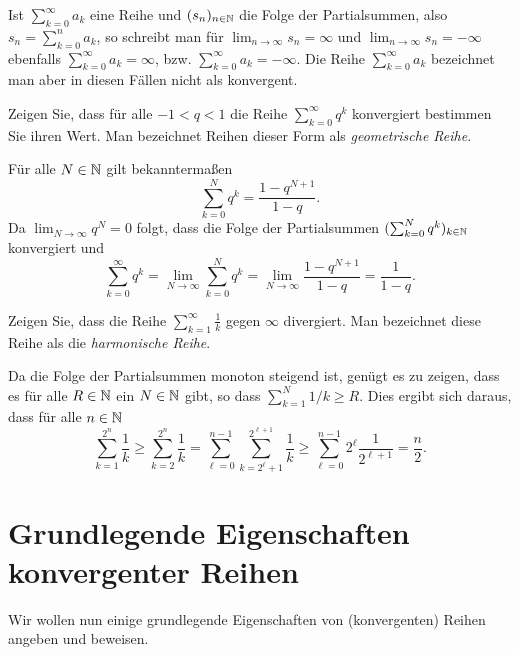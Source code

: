 \documentclass[a4paper,10pt]{article}
\begin{document}
\begin{bem}
 Ist $\sum_{k=0}^\infty a_k$ eine Reihe und $(s_n)_{n \in \mathbb{N}}$ die Folge der Partialsummen, also $s_n = \sum_{k=0}^n a_k$, so schreibt man für $\lim_{n \to \infty} s_n = \infty$ und $\lim_{n \to \infty} s_n = -\infty$ ebenfalls $\sum_{k=0}^\infty a_k = \infty$, bzw. $\sum_{k=0}^\infty a_k = -\infty$. Die Reihe $\sum_{k=0}^\infty a_k$ bezeichnet man aber in diesen Fällen nicht als konvergent.
\end{bem}


\begin{question}
 Zeigen Sie, dass für alle $-1 < q < 1$ die Reihe $\sum_{k=0}^\infty q^k$ konvergiert bestimmen Sie ihren Wert. Man bezeichnet Reihen dieser Form als \emph{geometrische Reihe}.
\end{question}
\begin{solution}
 Für alle $N \in \mathbb{N}$ gilt bekanntermaßen
 \[
  \sum_{k=0}^N q^k = \frac{1-q^{N+1}}{1-q}.
 \]
 Da $\lim_{N \to \infty} q^N = 0$ folgt, dass die Folge der Partialsummen $(\sum_{k=0}^N q^k)_{k \in \mathbb{N}}$ konvergiert und
 \[
  \sum_{k=0}^\infty q^k
  = \lim_{N \to \infty} \sum_{k=0}^N q^k
  = \lim_{N \to \infty} \frac{1-q^{N+1}}{1-q}
  = \frac{1}{1-q}.
 \]
\end{solution}


\begin{question}
 Zeigen Sie, dass die Reihe $\sum_{k=1}^\infty \frac{1}{k}$ gegen $\infty$ divergiert. Man bezeichnet diese Reihe als die \emph{harmonische Reihe}.
\end{question}
\begin{solution}
 Da die Folge der Partialsummen monoton steigend ist, genügt es zu zeigen, dass es für alle $R \in \mathbb{N}$ ein $N \in \mathbb{N}$ gibt, so dass $\sum_{k=1}^N 1/k \geq R$. Dies ergibt sich daraus, dass für alle $n \in \mathbb{N}$
 \[
  \sum_{k=1}^{2^n} \frac{1}{k}
  \geq \sum_{k=2}^{2^n} \frac{1}{k}
  = \sum_{\ell=0}^{n-1} \sum_{k=2^\ell+1}^{2^{\ell+1}} \frac{1}{k}
  \geq \sum_{\ell=0}^{n-1} 2^\ell \frac{1}{2^{\ell+1}}
  = \frac{n}{2}.
 \]
\end{solution}





\section{Grundlegende Eigenschaften konvergenter Reihen}


Wir wollen nun einige grundlegende Eigenschaften von (konvergenten) Reihen angeben und beweisen.
\end{document}
